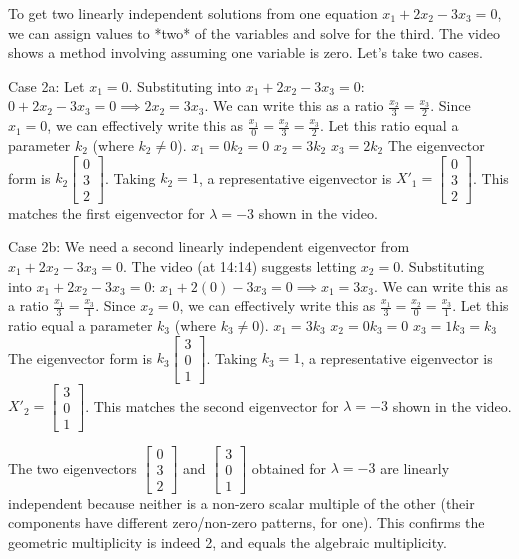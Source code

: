 \documentclass{article}
\begin{document}
To get two linearly independent solutions from one equation $x_1 + 2x_2 - 3x_3 = 0$, we can assign values to *two* of the variables and solve for the third. The video shows a method involving assuming one variable is zero. Let's take two cases.

Case 2a: Let $x_1 = 0$.
Substituting into $x_1 + 2x_2 - 3x_3 = 0$: $0 + 2x_2 - 3x_3 = 0 \implies 2x_2 = 3x_3$.
We can write this as a ratio $\frac{x_2}{3} = \frac{x_3}{2}$. Since $x_1=0$, we can effectively write this as $\frac{x_1}{0} = \frac{x_2}{3} = \frac{x_3}{2}$.
Let this ratio equal a parameter $k_2$ (where $k_2 \ne 0$).
$x_1 = 0k_2 = 0$
$x_2 = 3k_2$
$x_3 = 2k_2$
The eigenvector form is $k_2 \begin{bmatrix} 0 \\ 3 \\ 2 \end{bmatrix}$. Taking $k_2=1$, a representative eigenvector is $X'_1 = \begin{bmatrix} 0 \\ 3 \\ 2 \end{bmatrix}$. This matches the first eigenvector for $\lambda=-3$ shown in the video.

Case 2b: We need a second linearly independent eigenvector from $x_1 + 2x_2 - 3x_3 = 0$. The video (at 14:14) suggests letting $x_2 = 0$.
Substituting into $x_1 + 2x_2 - 3x_3 = 0$: $x_1 + 2(0) - 3x_3 = 0 \implies x_1 = 3x_3$.
We can write this as a ratio $\frac{x_1}{3} = \frac{x_3}{1}$. Since $x_2=0$, we can effectively write this as $\frac{x_1}{3} = \frac{x_2}{0} = \frac{x_3}{1}$.
Let this ratio equal a parameter $k_3$ (where $k_3 \ne 0$).
$x_1 = 3k_3$
$x_2 = 0k_3 = 0$
$x_3 = 1k_3 = k_3$
The eigenvector form is $k_3 \begin{bmatrix} 3 \\ 0 \\ 1 \end{bmatrix}$. Taking $k_3=1$, a representative eigenvector is $X'_2 = \begin{bmatrix} 3 \\ 0 \\ 1 \end{bmatrix}$. This matches the second eigenvector for $\lambda=-3$ shown in the video.

The two eigenvectors $\begin{bmatrix} 0 \\ 3 \\ 2 \end{bmatrix}$ and $\begin{bmatrix} 3 \\ 0 \\ 1 \end{bmatrix}$ obtained for $\lambda = -3$ are linearly independent because neither is a non-zero scalar multiple of the other (their components have different zero/non-zero patterns, for one). This confirms the geometric multiplicity is indeed 2, and equals the algebraic multiplicity.
\end{document}
